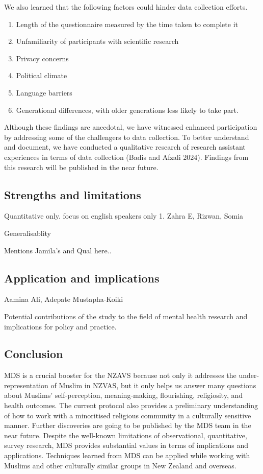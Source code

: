 \documentclass[
]{interact}
\providecommand{\tightlist}{%
  \setlength{\itemsep}{0pt}\setlength{\parskip}{0pt}}\usepackage{longtable,booktabs,array}
\begin{document}
We also learned that the following factors could hinder data collection
efforts.

\begin{enumerate}
\def\labelenumi{\arabic{enumi}.}
\tightlist
\item
  Length of the questionnaire measured by the time taken to complete it
\item
  Unfamiliarity of participants with scientific research
\item
  Privacy concerns
\item
  Political climate
\item
  Language barriers
\item
  Generatioanl differences, with older generations less likely to take
  part.
\end{enumerate}

Although these findings are anecdotal, we have witnessed enhanced
participation by addressing some of the challengers to data collection.
To better understand and document, we have conducted a qualitative
research of research assistant experiences in terms of data collection
(Badis and Afzali 2024). Findings from this research will be published
in the near future.

\subsection{Strengths and limitations}\label{strengths-and-limitations}

Quantitative only. focus on english speakers only 1. Zahra E, Rizwan,
Somia

Generalisablity

Mentions Jamila's and Qual here..

\subsection{Application and
implications}\label{application-and-implications}

Aamina Ali, Adepate Mustapha-Koiki

Potential contributions of the study to the field of mental health
research and implications for policy and practice.

\subsection{Conclusion}\label{conclusion}

MDS is a crucial booster for the NZAVS because not only it addresses the
under-representation of Muslim in NZVAS, but it only helps us answer
many questions about Muslims' self-perception, meaning-making,
flourishing, religiosity, and health outcomes. The current protocol also
provides a preliminary understanding of how to work with a minoritised
religious community in a culturally sensitive manner. Further
discoveries are going to be published by the MDS team in the near
future. Despite the well-known limitations of observational,
quantitative, survey research, MDS provides substantial values in terms
of implications and applications. Techniques learned from MDS can be
applied while working with Muslims and other culturally similar groups
in New Zealand and overseas.
\end{document}
